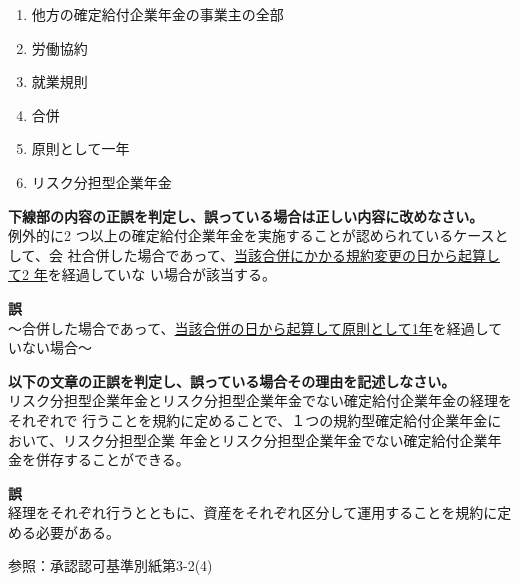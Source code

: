 \begin{answerbox}
 \begin{enumerate}[A:]
    \item 他方の確定給付企業年金の事業主の全部
    \item 労働協約
    \item 就業規則
    \item 合併
    \item 原則として一年
    \item リスク分担型企業年金
  \end{enumerate}
\end{answerbox}


\begin{truefalse}[年金1 \ 2019 \ 問題1(2)\textcircled{3}]
\textbf{下線部の内容の正誤を判定し、誤っている場合は正しい内容に改めなさい。}
\\

例外的に2 つ以上の確定給付企業年金を実施することが認められているケースとして、会
社合併した場合であって、\underline{当該合併にかかる規約変更の日から起算して2 年}を経過していな
い場合が該当する。
\end{truefalse}

\begin{answerbox}
 \textbf{誤} \\
  〜合併した場合であって、\underline{当該合併の日から起算して原則として1年}を経過していない場合〜
\end{answerbox}



\begin{truefalse}[年金1 \ H29 \ 問題2(1)\textcircled{3}]
\textbf{以下の文章の正誤を判定し、誤っている場合その理由を記述しなさい。}
\\

リスク分担型企業年金とリスク分担型企業年金でない確定給付企業年金の経理をそれぞれで
行うことを規約に定めることで、１つの規約型確定給付企業年金において、リスク分担型企業
年金とリスク分担型企業年金でない確定給付企業年金を併存することができる。
\end{truefalse}

\begin{answerbox}
 \textbf{誤} \\
  経理をそれぞれ行うとともに、資産をそれぞれ区分して運用することを規約に定める必要がある。
\end{answerbox}


\begin{explanationbox}
  参照：承認認可基準別紙第3-2(4) 

\end{explanationbox}



